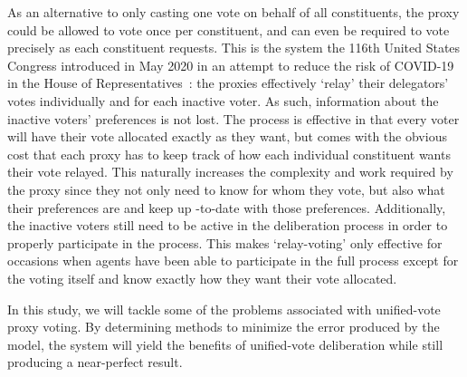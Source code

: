 As an alternative to only casting one vote on behalf of all constituents, the proxy
could be allowed to vote once per constituent, and can even be required to vote
precisely as each constituent requests.
This is the system the 116th United States Congress introduced in May 2020 in an
attempt to reduce the risk of COVID-19 in the House of
Representatives~\cite{CERP2020, Congress.gov2020}: the proxies effectively `relay' their
delegators' votes individually and for each inactive voter.
As such, information about the inactive voters' preferences is not lost.
The process is effective in that every voter will have their vote allocated exactly
as they want, but comes with the obvious cost that each proxy has to keep track
of how each individual constituent wants their vote relayed.
This naturally increases the complexity and work required by the proxy since they not
only need to know for whom they vote, but also what their preferences are and keep up
-to-date with those preferences.
Additionally, the inactive voters still need to be active in the deliberation process
in order to properly participate in the process.
This makes `relay-voting' only effective for occasions when agents have been able to
participate in the full process except for the voting itself and know exactly how
they want their vote allocated.

In this study, we will tackle some of the problems associated with unified-vote proxy
voting.
By determining methods to minimize the error produced by the model, the system will
yield the benefits of unified-vote deliberation while still producing a near-perfect
result.
